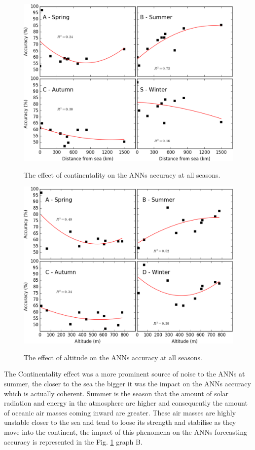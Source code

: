 \begin{figure}[htb!]
 \centering
  \caption{The effect of continentality on the ANNs accuracy at all seasons.}
 \includegraphics[scale=0.78]{capitulo_3/continentality_effect}
 \label{img:figure7}
\end{figure}
\begin{figure}[htb!]
 \centering
  \caption{The effect of altitude on the ANNs accuracy at all seasons.}
 \includegraphics[scale=0.78]{capitulo_3/topographic_effect}
 \label{img:figure8}
\end{figure}

\newpage
The Continentality effect was a more prominent source of noise to the ANNs at summer, the closer to the sea the bigger it was the impact on the ANNs accuracy which is actually coherent. Summer is the season that the amount of solar radiation and energy in the atmosphere are higher and consequently the amount of oceanic air masses coming inward are greater. These air masses are highly unstable closer to the sea and tend to loose its strength and stabilise as they move into the continent, the impact of this phenomena on the ANNs forecasting accuracy is represented in the Fig. \ref{img:figure7} graph B.

